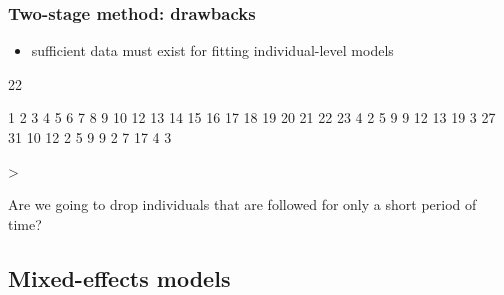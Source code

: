 \documentclass[10pt]{beamer}
\begin{document}
\begin{frame}[fragile]
\frametitle{Two-stage method: drawbacks}

\begin{itemize}
\item sufficient data must exist for fitting individual-level models
\end{itemize}

\begin{Schunk}
\begin{Soutput}
[1] 22
\end{Soutput}
\end{Schunk}


\begin{Schunk}
\begin{Soutput}
 1  2  3  4  5  6  7  8  9 10 12 13 14 15 16 17 18 19 20 21 22 23 
 4  2  5  9  9 12 13 19  3 27 31 10 12  2  5  9  9  2  7 17  4  3 
\end{Soutput}
\begin{Sinput}
> 
\end{Sinput}
\end{Schunk}

Are we going to drop individuals that are followed for only a short period of time?

\end{frame}


\subsection{Mixed-effects models}
\end{document}

